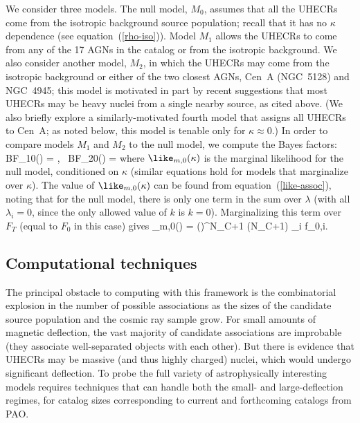 We consider three models.  The null model, $M_0$, assumes that all the
UHECRs come from the isotropic background source population; recall that it
has no $\kappa$ dependence (see equation~(\ref{rho-iso})).  Model $M_1$
allows the UHECRs to come from any of the 17 AGNs in the catalog or from the
isotropic background.  We also consider another model, $M_2$, in which the
UHECRs may come from the isotropic background or either of the two closest
AGNs, Cen~A (NGC~5128) and NGC~4945; this model is motivated in part by
recent suggestions that most UHECRs may be heavy nuclei from a single nearby
source, as cited above.  
(We also briefly explore a similarly-motivated fourth
model that assigns all UHECRs to Cen~A; as noted below, this model
is tenable only for $\kappa\approx 0$.)  In order to compare models $M_1$
and $M_2$ to the null model, we compute the Bayes factors:
\be
\mbox{BF}_{10}(\kappa) = ,
\qquad
\mbox{ BF}_{20}(\kappa) = 
\label{BF10+20}
\ee
where $\like_{m,0}(\kappa)$ is the marginal likelihood for the null
model, conditioned on $\kappa$ (similar equations hold for models
that marginalize over $\kappa$).  The value of $\like_{m,0}(\kappa)$
can be found from equation~(\ref{like-assoc}), noting that for the
null model, there is only one term in the sum over $\lambda$
(with all $\lambda_i = 0$, since the only allowed value of $k$ is $k=0$).
Marginalizing this term over $F_T$ (equal to $F_0$ in this case) gives
\be
\like_{m,0}(\kappa) =
  \left(\right)^{N_C+1}
  \Gamma(N_C+1) \times \prod_i f_{0,i}.
\ee

\subsection{Computational techniques}
\label{subsec:compn}

The principal obstacle to computing with this framework is the combinatorial
explosion in the number of possible associations as the sizes of the
candidate source population and the cosmic ray sample grow.  For small
amounts of magnetic deflection, the vast majority of candidate associations
are improbable (they associate well-separated objects with each other). But
there is evidence that UHECRs may be massive (and thus highly charged)
nuclei, which would undergo significant deflection. To probe the full
variety of astrophysically interesting models requires techniques that can
handle both the small- and large-deflection regimes, for catalog sizes
corresponding to current and forthcoming catalogs from PAO.

